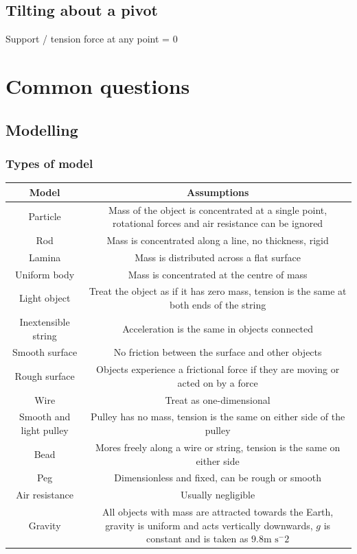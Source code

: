 \documentclass[A4paper]{article}
\begin{document}
	\subsection{Tilting about a pivot}
	Support / tension force at any point = 0
	


	\section{Common questions}
	\subsection{Modelling}
	\subsubsection{Types of model}
	\begin{tabular}{|c|c|}
		\hline
		\textbf{Model} & \textbf{Assumptions} \\
		\hline
		Particle & Mass of the object is concentrated at a single point, rotational forces and air resistance can be ignored \\
		\hline
		Rod & Mass is concentrated along a line, no thickness, rigid \\
		\hline
		Lamina & Mass is distributed across a flat surface \\
		\hline
		Uniform body & Mass is concentrated at the centre of mass \\
		\hline
		Light object & Treat the object as if it has zero mass, tension is the same at both ends of the string  \\
		\hline
		Inextensible string & Acceleration is the same in objects connected \\
		\hline
		Smooth surface & No friction between the surface and other objects\\
		\hline
		Rough surface &  Objects experience a frictional force if they are moving or acted on by a force  \\
		\hline
		Wire &  Treat as one-dimensional  \\
		\hline
		Smooth and light pulley & Pulley has no mass, tension is the same on either side of the pulley   \\
		\hline
		Bead & Mores freely along a wire or string, tension is the same on either side  \\
		\hline
		Peg & Dimensionless and fixed, can be rough or smooth \\
		\hline
		Air resistance & Usually negligible  \\
		\hline
		Gravity &  All objects with mass are attracted towards the Earth, gravity is uniform and acts vertically downwards, $g$ is constant and is taken as $9.8 \text{m s}^-2$  \\
		\hline
	\end{tabular}
	
\end{document}
